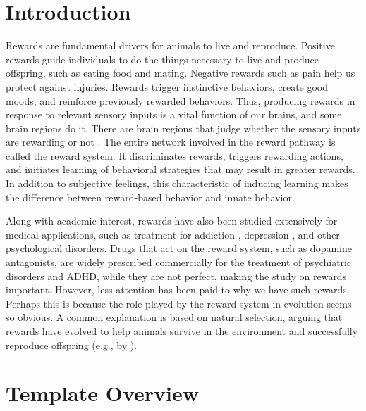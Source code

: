 \section{Introduction}

Rewards are fundamental drivers for animals to live and reproduce. Positive rewards guide individuals to do the things necessary to live and produce offspring, such as eating food and mating. Negative rewards such as pain help us protect against injuries. Rewards trigger instinctive behaviors, create good moods, and reinforce previously rewarded behaviors. Thus, producing rewards in response to relevant sensory inputs is a vital function of our brains, and some brain regions do it. There are brain regions that judge whether the sensory inputs are rewarding or not \cite{schultzNeuronalRewardDecision2015}. The entire network involved in the reward pathway is called the reward system.
It discriminates rewards, triggers rewarding actions, and initiates learning of behavioral strategies that may result in greater rewards. In addition to subjective feelings, this characteristic of inducing learning makes the difference between reward-based behavior and innate behavior.

Along with academic interest, rewards have also been studied extensively for medical applications, such as treatment for  addiction \cite{koobNeuroscienceAddiction1998,solinasDopamineAddictionWhat2019}, depression \cite{dunlopRoleDopaminePathophysiology2007}, and other psychological disorders.
Drugs that act on the reward system, such as dopamine antagonists, are widely prescribed commercially for the treatment of psychiatric disorders and ADHD, while they are not perfect, making the study on rewards important. However, less attention has been paid to why we have such rewards. Perhaps this is because the role played by the reward system in evolution seems so obvious. A common explanation is based on natural selection, arguing that rewards have evolved to help animals survive in the environment and successfully reproduce offspring (e.g., by \cite{schultzNeuronalRewardDecision2015}).

\section{Template Overview}